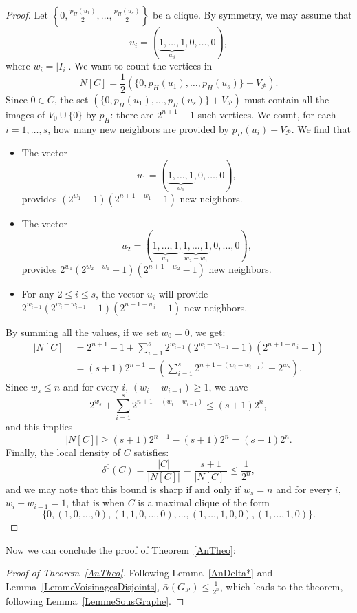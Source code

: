 \documentclass{amsart}                     %
\newcommand{\tref}[1]{Theorem~\textup{\ref{#1}}}
\newcommand{\lref}[1]{Lemma~\textup{\ref{#1}}}
\begin{document}
\begin{proof}

Let $\left\{0,\frac{p_H(u_1)}{2},\ldots,\frac{p_H(u_s)}{2}\right\}$ be a clique. By symmetry, we may assume that $$u_i=(\underbrace{1,\ldots, 1}_{w_i},0,\ldots,0), $$
where $w_i=|I_i|$. We want to count the vertices in $$N[C]=\frac{1}{2}\left( \{0,p_H(u_1),\ldots,p_H(u_s)\} + V_\mathcal{P} \right).$$   Since $0\in C$, the set $\left( \{0,p_H(u_1),\ldots,p_H(u_s)\} + V_\mathcal{P} \right)$ must contain all the images of $V_0\cup \{0\}$ by $p_H$: there are ${2^{n+1}-1}$ such vertices. We count,
 for each $i=1,\dots,s$, how many new neighbors are provided by $p_H(u_i)+V_{\mathcal P}$. We find that
\begin{itemize}
\item The vector $$u_1=(\underbrace{1,\ldots, 1}_{w_1},0,\ldots,0),$$ provides ${(2^{w_1}-1)(2^{n+1-w_1}-1)}$ {new neighbors}.
\item The vector $$u_2=(\underbrace{1,\ldots, 1}_{w_1},\underbrace{1,\ldots, 1}_{w_2-w_1},0,\ldots,0),$$
 provides ${2^{w_1}(2^{w_2-w_1}-1)(2^{n+1-w_2}-1)}$ {new neighbors}.
\item For any $2\leq i \leq s$, the vector $u_i$ will provide ${2^{w_{i-1}}(2^{w_i-w_{i-1}}-1)(2^{n+1-w_i}-1)}$ {new neighbors}.
\end{itemize}
By summing all the values, if we set  $w_0=0$, we get:
$$\begin{aligned} 
|N[C]|&=2^{n+1}-1 + \sum_{i=1}^{s} 2^{w_{i-1}}(2^{w_i-w_{i-1}}-1)(2^{n+1-w_i}-1) \\
 & = (s+1)2^{n+1} - (\sum_{i=1}^{s}2^{n+1-(w_i-w_{i-1})}+ 2^{w_s}).
  \end{aligned}$$
Since $w_s\leq n$ and for every $i$, $(w_i-w_{i-1})\geq 1$, we have 
$$2^{w_s} +\sum_{i=1}^{s}2^{n+1-(w_i-w_{i-1})}\leq (s+1)2^n,$$
and this implies
$$|N[C]|\geq (s+1)2^{n+1} - (s+1)2^n = (s+1)2^n.$$
Finally, the local density of $C$ satisfies:
$$ \delta^0(C) = \frac{|C|}{|N[C]|} = \frac{s+1}{|N[C]|} \leq \frac{1}{2^n} ,$$
and we may note that this bound is sharp if and only if $w_s=n$ and for every $i$, $w_i-w_{i-1} = 1$, that is when $C$ is a maximal clique of the form
$$ \{0, (1,0,\ldots,0), (1,1,0,\ldots,0), \ldots ,(1,\ldots,1,0,0), (1,\ldots,1,0)\}.  $$ 
\end{proof}

Now we can conclude the proof of \tref{AnTheo}:

\begin{proof}[Proof of \tref{AnTheo}] 
Following \lref{AnDelta*} and \lref{LemmeVoisinagesDisjoints}, $\bar{\alpha}(G_\mathcal{P})\leq\frac{1}{2^n}$, which leads to the theorem, following \lref{LemmeSousGraphe}.
\end{proof}
\end{document}
